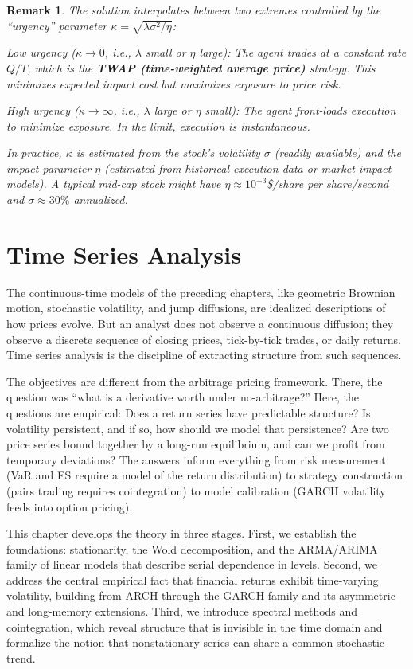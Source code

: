 \documentclass{report}
\theoremstyle{spacedplain}
\theoremstyle{spaceddefinition}
\theoremstyle{spacedremark}
\newtheorem{remark}[theorem]{Remark}
\begin{document}
\begin{remark}
The solution interpolates between two extremes controlled by the ``urgency'' parameter $\kappa = \sqrt{\lambda\sigma^2/\eta}$:

\emph{Low urgency ($\kappa \to 0$, i.e., $\lambda$ small or $\eta$ large):} The agent trades at a constant rate $Q/T$, which is the \textbf{TWAP (time-weighted average price)} strategy. This minimizes expected impact cost but maximizes exposure to price risk.

\emph{High urgency ($\kappa \to \infty$, i.e., $\lambda$ large or $\eta$ small):} The agent front-loads execution to minimize exposure. In the limit, execution is instantaneous.

In practice, $\kappa$ is estimated from the stock's volatility $\sigma$ (readily available) and the impact parameter $\eta$ (estimated from historical execution data or market impact models). A typical mid-cap stock might have $\eta \approx 10^{-3}$\$/share per share/second and $\sigma \approx 30\%$ annualized.
\end{remark}



\chapter{Time Series Analysis}

The continuous-time models of the preceding chapters, like geometric Brownian motion, stochastic volatility, and jump diffusions, are idealized descriptions of how prices evolve. But an analyst does not observe a continuous diffusion; they observe a discrete sequence of closing prices, tick-by-tick trades, or daily returns. Time series analysis is the discipline of extracting structure from such sequences.

The objectives are different from the arbitrage pricing framework. There, the question was ``what is a derivative worth under no-arbitrage?'' Here, the questions are empirical: Does a return series have predictable structure? Is volatility persistent, and if so, how should we model that persistence? Are two price series bound together by a long-run equilibrium, and can we profit from temporary deviations? The answers inform everything from risk measurement (VaR and ES require a model of the return distribution) to strategy construction (pairs trading requires cointegration) to model calibration (GARCH volatility feeds into option pricing).

This chapter develops the theory in three stages. First, we establish the foundations: stationarity, the Wold decomposition, and the ARMA/ARIMA family of linear models that describe serial dependence in levels. Second, we address the central empirical fact that financial returns exhibit time-varying volatility, building from ARCH through the GARCH family and its asymmetric and long-memory extensions. Third, we introduce spectral methods and cointegration, which reveal structure that is invisible in the time domain and formalize the notion that nonstationary series can share a common stochastic trend.
\end{document}
